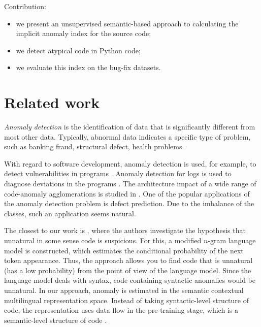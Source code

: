 \documentclass[10pt,conference]{IEEEtran}
\begin{document}
Contribution:
\begin{itemize}
\item  we present an unsupervised semantic-based approach to calculating the implicit anomaly index for the source code;
\item  we detect atypical code in Python code;
\item  we evaluate this index on the bug-fix datasets.
\end{itemize}


\section{Related work}\label{related}

{\it Anomaly detection} is the identification of data that is significantly different from most other data.
Typically, abnormal data indicates a specific type of problem, such as banking fraud, structural defect, health problems.

With regard to software development, anomaly detection is used, for example, to detect vulnerabilities in programs \cite{FengEtAl2003, GonzalezEtAl2021}.
Anomaly detection for logs is used to diagnose deviations in the programs \cite{HashemiMantyla2021a, HashemiMantyla2021b}.
The architecture impact of a wide range of code-anomaly agglomerations is studied in \cite{OizumiEtAl2015}.
One of the popular applications of the anomaly detection problem is defect prediction.
Due to the imbalance of the classes, such an application seems natural.

The closest to our work is \cite{RayEtAl2016}, where the authors investigate the hypothesis that unnatural in some sense code is suspicious.
For this, a modified $n$-gram language model is constructed, which estimates the conditional probability of the next token appearance.
Thus, the approach allows you to find code that is unnatural (has a low probability) from the point of view of the language model.
Since the language model deals with syntax, code containing syntactic anomalies would be unnatural.
In our approach, anomaly is estimated in the semantic contextual multilingual representation space.
Instead of taking syntactic-level structure of code, the representation uses data flow in the pre-training stage,
 which is a semantic-level structure of code \cite{GuoEtAl2021}.
\end{document}
